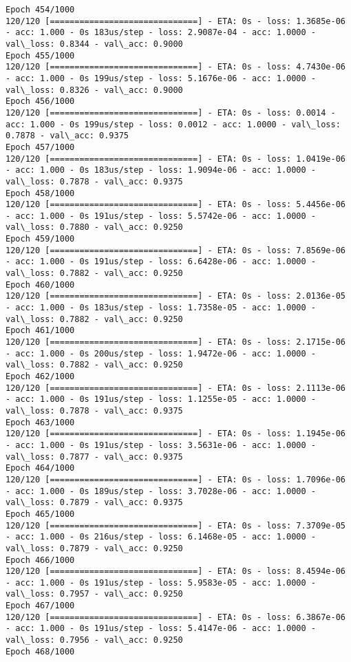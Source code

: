 \documentclass[11pt]{article}
\begin{document}
\begin{Verbatim}[commandchars=\\\{\}]
Epoch 454/1000
120/120 [==============================] - ETA: 0s - loss: 1.3685e-06 - acc: 1.000 - 0s 183us/step - loss: 2.9087e-04 - acc: 1.0000 - val\_loss: 0.8344 - val\_acc: 0.9000
Epoch 455/1000
120/120 [==============================] - ETA: 0s - loss: 4.7430e-06 - acc: 1.000 - 0s 199us/step - loss: 5.1676e-06 - acc: 1.0000 - val\_loss: 0.8326 - val\_acc: 0.9000
Epoch 456/1000
120/120 [==============================] - ETA: 0s - loss: 0.0014 - acc: 1.000 - 0s 199us/step - loss: 0.0012 - acc: 1.0000 - val\_loss: 0.7878 - val\_acc: 0.9375
Epoch 457/1000
120/120 [==============================] - ETA: 0s - loss: 1.0419e-06 - acc: 1.000 - 0s 183us/step - loss: 1.9094e-06 - acc: 1.0000 - val\_loss: 0.7878 - val\_acc: 0.9375
Epoch 458/1000
120/120 [==============================] - ETA: 0s - loss: 5.4456e-06 - acc: 1.000 - 0s 191us/step - loss: 5.5742e-06 - acc: 1.0000 - val\_loss: 0.7880 - val\_acc: 0.9250
Epoch 459/1000
120/120 [==============================] - ETA: 0s - loss: 7.8569e-06 - acc: 1.000 - 0s 191us/step - loss: 6.6428e-06 - acc: 1.0000 - val\_loss: 0.7882 - val\_acc: 0.9250
Epoch 460/1000
120/120 [==============================] - ETA: 0s - loss: 2.0136e-05 - acc: 1.000 - 0s 183us/step - loss: 1.7358e-05 - acc: 1.0000 - val\_loss: 0.7882 - val\_acc: 0.9250
Epoch 461/1000
120/120 [==============================] - ETA: 0s - loss: 2.1715e-06 - acc: 1.000 - 0s 200us/step - loss: 1.9472e-06 - acc: 1.0000 - val\_loss: 0.7882 - val\_acc: 0.9250
Epoch 462/1000
120/120 [==============================] - ETA: 0s - loss: 2.1113e-06 - acc: 1.000 - 0s 191us/step - loss: 1.1255e-05 - acc: 1.0000 - val\_loss: 0.7878 - val\_acc: 0.9375
Epoch 463/1000
120/120 [==============================] - ETA: 0s - loss: 1.1945e-06 - acc: 1.000 - 0s 191us/step - loss: 3.5631e-06 - acc: 1.0000 - val\_loss: 0.7877 - val\_acc: 0.9375
Epoch 464/1000
120/120 [==============================] - ETA: 0s - loss: 1.7096e-06 - acc: 1.000 - 0s 189us/step - loss: 3.7028e-06 - acc: 1.0000 - val\_loss: 0.7879 - val\_acc: 0.9375
Epoch 465/1000
120/120 [==============================] - ETA: 0s - loss: 7.3709e-05 - acc: 1.000 - 0s 216us/step - loss: 6.1468e-05 - acc: 1.0000 - val\_loss: 0.7879 - val\_acc: 0.9250
Epoch 466/1000
120/120 [==============================] - ETA: 0s - loss: 8.4594e-06 - acc: 1.000 - 0s 191us/step - loss: 5.9583e-05 - acc: 1.0000 - val\_loss: 0.7957 - val\_acc: 0.9250
Epoch 467/1000
120/120 [==============================] - ETA: 0s - loss: 6.3867e-06 - acc: 1.000 - 0s 191us/step - loss: 5.4147e-06 - acc: 1.0000 - val\_loss: 0.7956 - val\_acc: 0.9250
Epoch 468/1000

\end{Verbatim}
\end{document}
